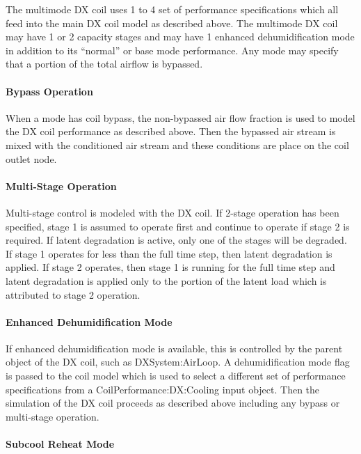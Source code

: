 The multimode DX coil uses 1 to 4 set of performance specifications which all feed into the main DX coil model as described above. The multimode DX coil may have 1 or 2 capacity stages and may have 1 enhanced dehumidification mode in addition to its ``normal'' or base mode performance. Any mode may specify that a portion of the total airflow is bypassed.

\paragraph{Bypass Operation}\label{bypass-operation}

When a mode has coil bypass, the non-bypassed air flow fraction is used to model the DX coil performance as described above. Then the bypassed air stream is mixed with the conditioned air stream and these conditions are place on the coil outlet node.

\paragraph{Multi-Stage Operation}\label{multi-stage-operation}

Multi-stage control is modeled with the DX coil. If 2-stage operation has been specified, stage 1 is assumed to operate first and continue to operate if stage 2 is required. If latent degradation is active, only one of the stages will be degraded. If stage 1 operates for less than the full time step, then latent degradation is applied. If stage 2 operates, then stage 1 is running for the full time step and latent degradation is applied only to the portion of the latent load which is attributed to stage 2 operation.

\paragraph{Enhanced Dehumidification Mode}\label{enhanced-dehumidification-mode}

If enhanced dehumidification mode is available, this is controlled by the parent object of the DX coil, such as DXSystem:AirLoop. A dehumidification mode flag is passed to the coil model which is used to select a different set of performance specifications from a CoilPerformance:DX:Cooling input object. Then the simulation of the DX coil proceeds as described above including any bypass or multi-stage operation.

\paragraph{Subcool Reheat Mode}\label{subcool-reheat-mode}

